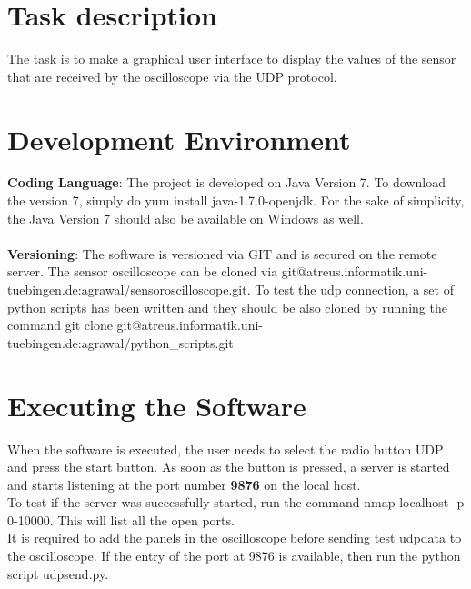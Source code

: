 \chapter{Task description}The task is to make a graphical user interface to display the values of the sensor that are received by the oscilloscope via the UDP protocol.


\chapter{Development Environment} 
\textbf{Coding Language}: The project is developed on Java Version 7. To download the version 7, simply do yum install java-1.7.0-openjdk. For the sake of simplicity, the Java Version 7 should also be available on Windows as well.\\\\
\textbf{Versioning}: The software is versioned via GIT and is secured on the remote server. The sensor oscilloscope can be cloned via git@atreus.informatik.uni-tuebingen.de:agrawal/sensoroscilloscope.git. To test the udp connection, a set of python scripts has been written and they should be also cloned by running the command git clone git@atreus.informatik.uni-tuebingen.de:agrawal/python\_scripts.git\\

\chapter{Executing the Software}
When the software is executed, the user needs to select the radio button UDP and press the start button. As soon as the button is pressed, a server is started and starts listening at the port number \textbf{9876} on the local host.\\
To test if the server was successfully started, run the command nmap localhost -p 0-10000. This will list all the open ports.\\
It is required to add the panels in the oscilloscope before sending test udpdata to the oscilloscope. If the entry of the port at 9876 is available, then run the python script udpsend.py. 



